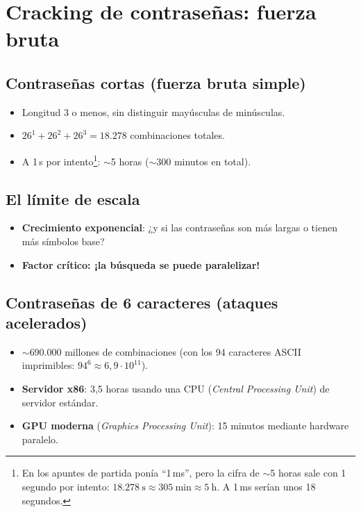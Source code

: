 \documentclass[11pt,a4paper]{report}
\newcommand{\destacar}[1]{\textcolor{red!70!black}{\textbf{#1}}}
\begin{document}
\section{Cracking de contraseñas: fuerza bruta}
 
\subsection{Contraseñas cortas (fuerza bruta simple)}
\begin{itemize}
  \item Longitud 3 o menos, sin distinguir mayúsculas de minúsculas.
  \item $26^1 + 26^2 + 26^3 = 18.278$ combinaciones totales.
  \item A 1\,s por intento\footnote{En los apuntes de partida ponía ``1\,ms'', pero la cifra de $\sim$5 horas sale con 1 segundo por intento: $18.278\ \text{s} \approx 305\ \text{min} \approx 5\ \text{h}$. A 1\,ms serían unos 18 segundos.}: $\sim$5 horas ($\sim$300 minutos en total).
\end{itemize}
 
\subsection{El límite de escala}
\begin{itemize}
  \item \textbf{Crecimiento exponencial}: ¿y si las contraseñas son más largas o tienen más símbolos base?
  \item \destacar{Factor crítico: ¡la búsqueda se puede paralelizar!}
\end{itemize}
 
\subsection{Contraseñas de 6 caracteres (ataques acelerados)}
\begin{itemize}
  \item $\sim$690.000 millones de combinaciones (con los 94 caracteres ASCII imprimibles: $94^6 \approx 6{,}9 \cdot 10^{11}$).
  \item \textbf{Servidor x86}: 3,5 horas usando una CPU (\emph{Central Processing Unit}) de servidor estándar.
  \item \textbf{GPU moderna} (\emph{Graphics Processing Unit}): 15 minutos mediante hardware paralelo.
\end{itemize}
 
\end{document}
